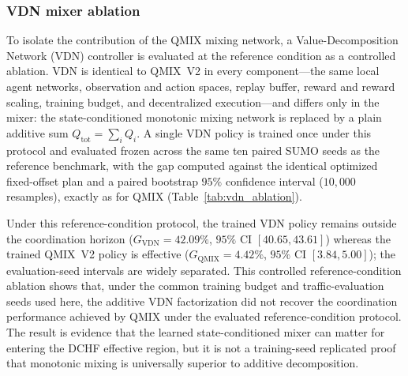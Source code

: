 \documentclass[review,12pt]{elsarticle}
\begin{document}
\subsubsection{VDN mixer ablation}
\label{subsubsec:vdn_ablation}

To isolate the contribution of the QMIX mixing network, a Value-Decomposition Network (VDN) controller is evaluated at the reference condition as a controlled ablation. VDN is identical to QMIX~V2 in every component---the same local agent networks, observation and action spaces, replay buffer, reward and reward scaling, training budget, and decentralized execution---and differs only in the mixer: the state-conditioned monotonic mixing network is replaced by a plain additive sum $Q_{\mathrm{tot}}=\sum_i Q_i$. A single VDN policy is trained once under this protocol and evaluated frozen across the same ten paired SUMO seeds as the reference benchmark, with the gap computed against the identical optimized fixed-offset plan and a paired bootstrap $95\%$ confidence interval ($10{,}000$ resamples), exactly as for QMIX (Table~\ref{tab:vdn_ablation}).

Under this reference-condition protocol, the trained VDN policy remains outside the coordination horizon ($G_{\mathrm{VDN}}=42.09\%$, $95\%$ CI $[40.65, 43.61]$) whereas the trained QMIX~V2 policy is effective ($G_{\mathrm{QMIX}}=4.42\%$, $95\%$ CI $[3.84, 5.00]$); the evaluation-seed intervals are widely separated. This controlled reference-condition ablation shows that, under the common training budget and traffic-evaluation seeds used here, the additive VDN factorization did not recover the coordination performance achieved by QMIX under the evaluated reference-condition protocol. The result is evidence that the learned state-conditioned mixer can matter for entering the DCHF effective region, but it is not a training-seed replicated proof that monotonic mixing is universally superior to additive decomposition.

\begin{table}[H]
\centering
\caption{Controlled mixer ablation at the two-intersection reference
condition ($d=300$~m, medium demand, $N=2$), using ten paired
evaluation seeds. Both controllers are compared with the same optimized
fixed-offset benchmark ($169.782$~s). VDN differs from QMIX~V2 only
in the mixer; gaps are reported with paired-bootstrap $95\%$ CIs.
Because fixed trained policies are evaluated, the comparison measures
evaluation-seed robustness rather than training-seed variability.}
\label{tab:vdn_ablation}
\end{table}
\end{document}

